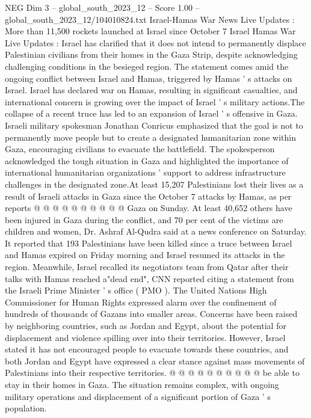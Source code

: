 \begin{textsample}{NEG Dim 3 – global\_south\_2023\_12 – Score 1.00 – global\_south\_2023\_12/104010824.txt}  \label{ex:f3_neg_013}
Israel-Hamas War News Live Updates : More than 11,500 rockets launched at Israel since October 7 Israel Hamas War Live Updates : Israel has clarified that it does not intend to permanently displace Palestinian civilians from their homes in the Gaza Strip, despite acknowledging challenging conditions in the besieged region.
The statement comes amid the ongoing conflict between Israel and Hamas, triggered by Hamas ' s attacks on Israel.
Israel has declared war on Hamas, resulting in significant casualties, and international concern is growing over the impact of Israel ' s military actions.The collapse of a recent truce has led to an expansion of Israel ' s offensive in Gaza.
Israeli military spokesman Jonathan Conricus emphasized that the goal is not to permanently move people but to create a designated humanitarian zone within Gaza, encouraging civilians to evacuate the battlefield.
The spokesperson acknowledged the tough situation in Gaza and highlighted the importance of international humanitarian organizations ' support to address infrastructure challenges in the designated zone.At least 15,207 Palestinians lost their lives as a result of Israeli attacks in Gaza since the October 7 attacks by Hamas, as per reports @ @ @ @ @ @ @ @ @ @ Gaza on Sunday.
At least 40,652 others have been injured in Gaza during the conflict, and 70 per cent of the victims are children and women, Dr.
Ashraf Al-Qudra said at a news conference on Saturday.
It reported that 193 Palestinians have been killed since a truce between Israel and Hamas expired on Friday morning and Israel resumed its attacks in the region.
Meanwhile, Israel recalled its negotiators team from Qatar after their talks with Hamas reached a"dead end", CNN reported citing a statement from the Israeli Prime Minister ' s office ( PMO ).
The United Nations High Commissioner for Human Rights expressed alarm over the confinement of hundreds of thousands of Gazans into smaller areas.
Concerns have been raised by neighboring countries, such as Jordan and Egypt, about the potential for displacement and violence spilling over into their territories.
However, Israel stated it has not encouraged people to evacuate towards these countries, and both Jordan and Egypt have expressed a clear stance against mass movements of Palestinians into their respective territories. @ @ @ @ @ @ @ @ @ @ be able to stay in their homes in Gaza.
The situation remains complex, with ongoing military operations and displacement of a significant portion of Gaza ' s population.

\end{textsample}

